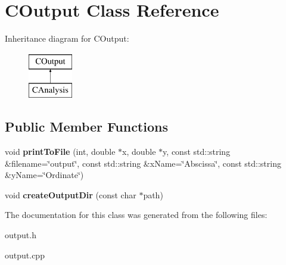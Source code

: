 \hypertarget{classCOutput}{}\section{C\+Output Class Reference}
\label{classCOutput}
Inheritance diagram for C\+Output\+:\begin{figure}[H]
\begin{center}
\leavevmode
\includegraphics[height=2.000000cm]{classCOutput}
\end{center}
\end{figure}
\subsection*{Public Member Functions}
\begin{DoxyCompactItemize}
\item 
\mbox{\label{classCOutput_a01760ac1e3f30b98ebfd768e3e100e87}} 
void {\bfseries print\+To\+File} (int, double $\ast$x, double $\ast$y, const std\+::string \&filename=\char`\"{}output\char`\"{}, const std\+::string \&x\+Name=\char`\"{}Abscissa\char`\"{}, const std\+::string \&y\+Name=\char`\"{}Ordinate\char`\"{})
\item 
\mbox{\label{classCOutput_a166f58fa47dc422665a223974e707241}} 
void {\bfseries create\+Output\+Dir} (const char $\ast$path)
\end{DoxyCompactItemize}


The documentation for this class was generated from the following files\+:\begin{DoxyCompactItemize}
\item 
output.\+h\item 
output.\+cpp\end{DoxyCompactItemize}
